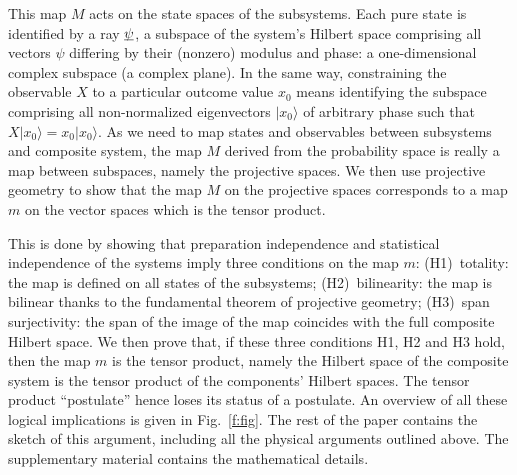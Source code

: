 \documentclass[aps,prl,amsmath,amssymb,twocolumn]{revtex4}
\theoremstyle{plain}
\theoremstyle{definition}
\theoremstyle{remark}
\newcommand{\pj}[1] {\underbar{$#1$}}
\def\>{\rangle}
\def\comment#1{}
\begin{document}
\comment{mettere nel supplementary: We will mainly focus on
  kine\-mati\-cal\-ly-inde\-pen\-dent systems, namely no
  superselection rules or other restrictions to the state space are
  present: it is possible to prepare each subsystem of a composite
  system in a state that is independent of the other systems
  (preparation independence).  This is the only case in which the
  tensor product can be properly employed: the Hilbert space of
  composite systems that have restrictions is {\em not} the tensor
  product of the component spaces, but a subspace of it (e.g.~the
  anti-symmetric subspace for fermions). Typically this is ignored in
  the literature, since the tensor product formalism is very
  convenient and is often used also in these cases, and superselection
  rules are typically avoidable \cite{susskind,zanardi,zanardilloyd}.
}
	
This map $M$ acts on the state spaces of the subsystems. Each pure
state is identified by a ray $\pj{\psi}$, a subspace of the system's
Hilbert space comprising all vectors $\psi$ differing by their
(nonzero) modulus and phase: a one-dimensional complex subspace (a complex plane). In
the same way, constraining the observable $X$ to a particular outcome
value $x_0$ means identifying the subspace comprising all
non-normalized eigenvectors $|x_0\>$ of arbitrary phase such that
$X | x_0 \> = x_0 |x_0\>$. As we need to map states and observables
between subsystems and composite system, the map $M$ derived from the
probability space is really a map between subspaces, namely the
projective spaces. We then use projective geometry to show that the
map $M$ on the projective spaces corresponds to a map $m$ on the
vector spaces which is the tensor product.

This is done by showing that preparation independence and statistical
independence of the systems imply three conditions on the map $m$:
(H1)~totality: the map is defined on all states of the subsystems;
(H2)~bilinearity: the map is bilinear thanks to the fundamental
theorem of projective geometry; (H3)~span surjectivity: the span of
the image of the map coincides with the full composite Hilbert space.  We
then prove that, if these three conditions H1, H2 and H3 hold, then
the map $m$ is the tensor product, namely the Hilbert space of the
composite system is the tensor product of the components' Hilbert spaces. The tensor
product ``postulate'' hence loses its status of a postulate. An
overview of all these logical implications is given in
Fig.~\ref{f:fig}. The rest of the paper contains the sketch of this
argument, including all the physical arguments outlined above. The
supplementary material contains the mathematical details.
	
\end{document}
